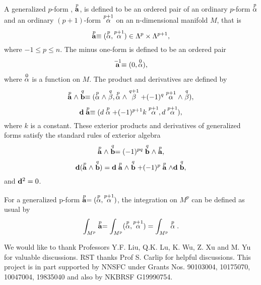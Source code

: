 \documentclass[a4paper,twocolumn,showpacs,prd]{revtex4}
\begin{document}
A generalized $p$-form \cite{Sparling}\cite{NR2001},
$\GForm{p}{a}$, is defined to be an ordered pair of an ordinary
$p$-form $\Form{p}{\alpha}$ and an ordinary $(p+1)$-form
$\Form{p+1}{\alpha}$ on an n-dimensional manifold $M$, that is
\begin{equation}
\GForm{p}{a} \equiv (\Form{p}{\alpha},\Form{p+1}{\alpha}) \in
\Lambda^p \times \Lambda^{p+1} ,
\end{equation}
where $-1 \leq p \leq n$. The minus one-form is defined to be an
ordered pair
\begin{equation}
\GForm{-1}{a}\equiv (0, \Form{0}{\alpha}) ,
\end{equation}
where $\Form{0}{\alpha}$ is a function on $M$. The product and
derivatives are defined by
\begin{equation}
\GForm{p}{a} \wedge \GForm{q}{b}\equiv ( \Form{p}{\alpha}\wedge
\Form{q}{\beta}, \Form{p}{\alpha} \wedge \Form{q+1}{\beta}+(-1)^q
\Form{p+1}{\alpha}\wedge \Form{q}{\beta}) ,
\end{equation}
\begin{equation}
\Gd \GForm{p}{a} \equiv ( d \Form{p}{\alpha}+(-1)^{p+1} k
\Form{p+1}{\alpha}, d \Form{p+1}{\alpha}) ,
\end{equation}
where $k$ is a constant. These exterior products
and derivatives of generalized forms satisfy the
standard rules of exterior algebra
\begin{equation}
\GForm{p}{a} \wedge \GForm{q}{b} = (-1)^{pq} \GForm{q}{b} \wedge
\GForm{p}{a} ,
\end{equation}
\begin{equation}
\Gd (\GForm{p}{a} \wedge \GForm{q}{b}) = \Gd \GForm{p}{a} \wedge
\GForm{q}{b} + (-1)^{p} \GForm{p}{a} \wedge \Gd \GForm{q}{b} ,
\end{equation}
and ${\bf d}^2=0$.

For a generalized p-form $\GForm{p}{a}=
(\Form{p}{\alpha},\Form{p+1}{\alpha})$, the
integration on $M^p$ can be defined as usual by
\begin{equation}
\int_{M^p} \GForm{p}{a}=\int_{M^p}
(\Form{p}{\alpha},\Form{p+1}{\alpha}) =
\int_{M^p} \Form{p}{\alpha} .
\end{equation}


\begin{acknowledgments}
We would like to thank Professors Y.F. Liu, Q.K. Lu, K. Wu, Z. Xu
and M. Yu for valuable discussions. RST thanks Prof S. Carlip for
helpful discussions. This project is in part supported by NNSFC
under Grants Nos. 90103004, 10175070, 10047004, 19835040 and also
by NKBRSF G19990754.
\end{acknowledgments}
\end{document}
